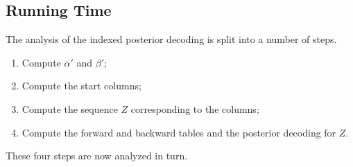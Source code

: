 \subsection{Running Time}
\label{sec:running-time-2}

The analysis of the indexed posterior decoding is split into a number of
steps.
\begin{enumerate}
\item Compute $\alpha'$ and $\beta'$;
\item Compute the start columns;
\item Compute the sequence $Z$ corresponding to the columns;
\item Compute the forward and backward tables and the posterior decoding for
  $Z$.
\end{enumerate}
These four steps are now analyzed in turn.

